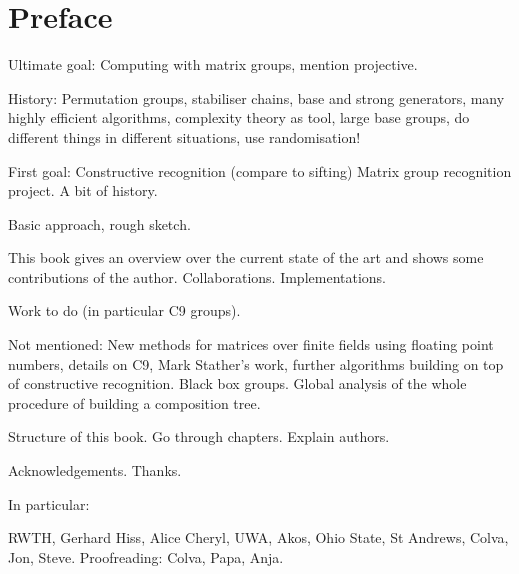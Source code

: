 
\chapter*{Preface}

Ultimate goal: Computing with matrix groups, mention projective.

History: Permutation groups, stabiliser chains, base and strong generators,
many highly efficient algorithms, complexity theory as tool, large
base groups, do different things in different situations, use
randomisation!

First goal: Constructive recognition (compare to sifting)
Matrix group recognition project. A bit of history.

Basic approach, rough sketch.

This book gives an overview over the current state of the art and
shows some contributions of the author. Collaborations.
Implementations.

Work to do (in particular C9 groups).

Not mentioned: New methods for matrices over finite fields using
floating point numbers, details on C9, Mark Stather's work, further
algorithms building on top of constructive recognition. Black box
groups. Global analysis of the whole procedure of building a
composition tree.

Structure of this book. Go through chapters. Explain authors.

Acknowledgements. Thanks.

In particular:

RWTH, Gerhard Hiss, Alice Cheryl, UWA, Akos, Ohio State, St Andrews, Colva, Jon,
Steve. Proofreading: Colva, Papa, Anja.

